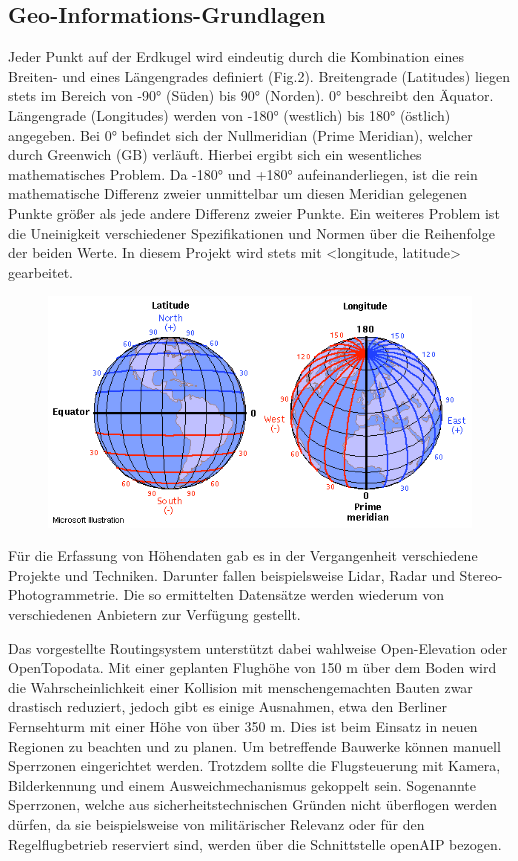 \subsection*{Geo-Informations-Grundlagen}
Jeder Punkt auf der Erdkugel wird eindeutig durch die Kombination eines Breiten- und eines Längengrades definiert (Fig.2).
Breitengrade (Latitudes) liegen stets im Bereich von -90° (Süden) bis 90° (Norden). 0° beschreibt den Äquator.
Längengrade (Longitudes) werden von -180° (westlich) bis 180° (östlich) angegeben. Bei 0° befindet sich der Nullmeridian (Prime Meridian), welcher durch Greenwich (GB) verläuft.
Hierbei ergibt sich ein wesentliches mathematisches Problem.
Da -180° und +180° aufeinanderliegen, ist die rein mathematische Differenz zweier unmittelbar um diesen Meridian gelegenen Punkte größer als jede andere Differenz zweier Punkte.
Ein weiteres Problem ist die Uneinigkeit verschiedener Spezifikationen und Normen über die Reihenfolge der beiden Werte.
In diesem Projekt wird stets mit <longitude, latitude> gearbeitet.

\begin{figure}[h]
    \includegraphics[width=\columnwidth]{images/lat-lon-world}
\end{figure}

Für die Erfassung von Höhendaten gab es in der Vergangenheit verschiedene Projekte und Techniken.
Darunter fallen beispielsweise Lidar, Radar und Stereo-Photogrammetrie. Die so ermittelten Datensätze werden wiederum von verschiedenen Anbietern zur Verfügung gestellt.

Das vorgestellte Routingsystem unterstützt dabei wahlweise Open-Elevation oder OpenTopodata.
Mit einer geplanten Flughöhe von 150 m über dem Boden wird die Wahrscheinlichkeit einer Kollision mit menschengemachten Bauten zwar drastisch reduziert, jedoch gibt es einige Ausnahmen, etwa den Berliner Fernsehturm mit einer Höhe von über 350 m. Dies ist beim Einsatz in neuen Regionen zu beachten und zu planen. Um betreffende Bauwerke können manuell Sperrzonen eingerichtet werden. Trotzdem sollte die Flugsteuerung mit Kamera, Bilderkennung und einem Ausweichmechanismus gekoppelt sein.
Sogenannte Sperrzonen, welche aus sicherheitstechnischen Gründen nicht überflogen werden dürfen, da sie beispielsweise von militärischer Relevanz oder für den Regelflugbetrieb reserviert sind, werden über die Schnittstelle openAIP bezogen.